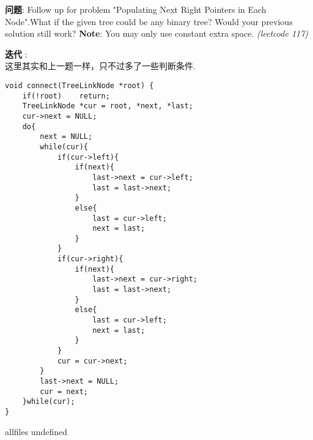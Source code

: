 \documentclass{article}
\begin{document}
\begin{CJK}{UTF8}{gbsn}     %

\else
    
\begin{description}
    \item{\textbf{问题}}: Follow up for problem "Populating Next Right Pointers in Each Node".What if the given tree could be any binary tree? Would your previous solution still work?
    \textbf{Note}: You may only use constant extra space. \textit{(leetcode 117)}
    \item{\textbf{迭代}} : 
    \\这里其实和上一题一样，只不过多了一些判断条件.
    \begin{lstlisting}
void connect(TreeLinkNode *root) {
    if(!root)    return;
    TreeLinkNode *cur = root, *next, *last;
    cur->next = NULL;
    do{
        next = NULL;
        while(cur){
            if(cur->left){
                if(next){
                    last->next = cur->left;
                    last = last->next;
                }
                else{
                    last = cur->left;
                    next = last;
                }
            }
            if(cur->right){
                if(next){
                    last->next = cur->right;
                    last = last->next;
                }
                else{
                    last = cur->left;
                    next = last;
                }
            }
            cur = cur->next;
        }
        last->next = NULL;
        cur = next;
    }while(cur);
}
    \end{lstlisting}
    \textit{}
\end{description}

\fi

\ifx allfiles undefined
\end{CJK}
\end{document}
